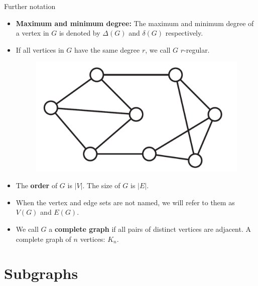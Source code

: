 \documentclass{beamer}
\def\itemb{\begin{itemize}}
\def\iteme{\end{itemize}}
\begin{document}
\begin{frame}{Further notation}
\itemb
\item \textbf{Maximum and minimum degree:} The maximum and minimum degree of a vertex in $G$ is denoted by $\Delta(G)$ and $\delta(G)$ respectively.
\item If all vertices in $G$ have the same degree $r$, we call $G$ $r$-regular.
\begin{figure}
\centering
\includegraphics[scale=0.15]{Regular.pdf}
\end{figure}
\item The \textbf{order} of $G$ is $|V|$. The size of $G$ is $|E|$.
\item When the vertex and edge sets are not named, we will refer to them as $V(G)$ and $E(G)$.
\item We call $G$ a \textbf{complete graph} if all pairs of distinct vertices are adjacent. A complete graph of $n$ vertices: $K_n$.
\iteme
\end{frame}

\section{Subgraphs}
\end{document}
